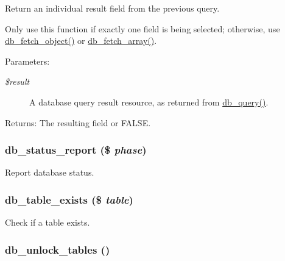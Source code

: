 Return an individual result field from the previous query.

Only use this function if exactly one field is being selected; otherwise, use \hyperlink{database_8mysql_8inc_5faaeba7105d28828db453b4fd3c75d4}{db\_\-fetch\_\-object()} or \hyperlink{database_8mysql_8inc_2bd5f98fec7f21ee2c37f6b83785dcb9}{db\_\-fetch\_\-array()}.

\begin{Desc}
\item[Parameters:]
\begin{description}
\item[{\em \$result}]A database query result resource, as returned from \hyperlink{database_8mysql-common_8inc_9e096321b86945d128746ac7bedce8f3}{db\_\-query()}. \end{description}
\end{Desc}
\begin{Desc}
\item[Returns:]The resulting field or FALSE. \end{Desc}
\hypertarget{database_8mysqli_8inc_497d9afd8edb209108db34ea159c77ca}{
\subsubsection[{db\_\-status\_\-report}]{\setlength{\rightskip}{0pt plus 5cm}db\_\-status\_\-report (\$ {\em phase})}}
\label{database_8mysqli_8inc_497d9afd8edb209108db34ea159c77ca}


Report database status. \hypertarget{database_8mysqli_8inc_78809300cee80db034832825aed55b70}{
\subsubsection[{db\_\-table\_\-exists}]{\setlength{\rightskip}{0pt plus 5cm}db\_\-table\_\-exists (\$ {\em table})}}
\label{database_8mysqli_8inc_78809300cee80db034832825aed55b70}


Check if a table exists. \hypertarget{database_8mysqli_8inc_827df02252c1d606c685b768807b7181}{
\subsubsection[{db\_\-unlock\_\-tables}]{\setlength{\rightskip}{0pt plus 5cm}db\_\-unlock\_\-tables ()}}
\label{database_8mysqli_8inc_827df02252c1d606c685b768807b7181}


